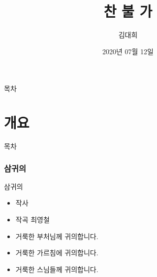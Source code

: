 \documentclass[aspectratio=1610,17pt,xcolor=pdftex,dvipsnames,table,handout]{beamer}
\begin{document}
	

			\title{찬 불 가}

			\author{김대희}

			\date{2020년 07월 12일}




		\begin{frame}[plain]
		\titlepage
		\end{frame}



		\begin{frame} {목차}
		\tableofcontents
		\end{frame}
		

		\part{개요}
		\frame{\partpage}


		\begin{frame} [plain]{목차}
		\tableofcontents
		\end{frame}
		

		
				
		
		\section{ 삼귀의 }
		

		\begin{frame} [t,plain]
			\begin{block} { 삼귀의 }

			\setlength{\leftmargini}{2em}			
			\begin{itemize}
				\item 작사
				\item 작곡 최영철

				\item 거룩한 부처님께 귀의합니다.
				\item 거룩한 가르침에 귀의합니다.
				\item 거룩한 스님들께 귀의합니다.
			\end{itemize}
			
			\end{block}
		\end{frame} 	%
\end{document}
